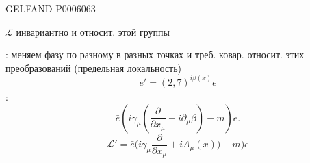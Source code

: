 \begin{GelfandAdjacentEvidence}{GELFAND-P000606}{3}


\(\mathcal L\) инвариантно и относит. этой группы\qquad {}

: меняем фазу по разному в разных точках и треб. ковар. относит. этих преобразований (предельная локальность)
\[
\underline{e'=(2{,}7)^{i\beta(x)}e}
\]
:
\[
\bar e\left(i\gamma_\mu\left(\frac{\partial}{\partial x_\mu}+i\partial_\mu\beta\right)-m\right)e.
\]
\[
\mathcal L'=\bar e\biggl(i\gamma_\mu\frac{\partial}{\partial x_\mu}
+iA_\mu(x)\biggr)-m\biggr)e
\]
\end{GelfandAdjacentEvidence}



